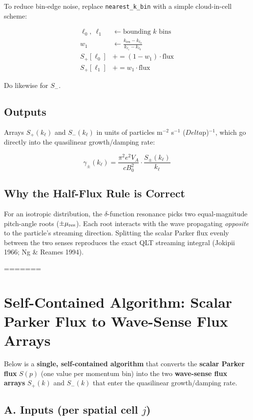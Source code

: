 To reduce bin-edge noise, replace \texttt{nearest\_k\_bin} with a simple cloud-in-cell scheme:

\[
\begin{aligned}
\ell_0,\ \ell_1 &\leftarrow \text{bounding $k$ bins} \\
w_1 &\leftarrow \frac{k_{\text{res}} - k_{\ell_0}}{k_{\ell_1} - k_{\ell_0}} \\
S_{+}[\ell_0] &\mathrel{+}= (1 - w_1) \cdot \text{flux} \\
S_{+}[\ell_1] &\mathrel{+}= w_1 \cdot \text{flux}
\end{aligned}
\]


Do likewise for $S_{-}$.

\subsection*{Outputs}

Arrays $S_{+}(k_\ell)$ and $S_{-}(k_\ell)$ in units of particles m$^{-2}$ s$^{-1}$ ($Delta$p)$^{-1}$, which go directly into the quasilinear growth/damping rate:

\[
\gamma_\pm(k_\ell) = \frac{\pi^{2} e^{2} V_A}{c B_0^{2}} \cdot \frac{S_\pm(k_\ell)}{k_\ell}
\]

\subsection*{Why the Half-Flux Rule is Correct}

For an isotropic distribution, the $\delta$-function resonance picks two equal-magnitude pitch-angle roots ($\pm \mu_{\rm res}$).  
Each root interacts with the wave propagating \textit{opposite} to the particle’s streaming direction.  
Splitting the scalar Parker flux evenly between the two senses reproduces the exact QLT streaming integral (Jokipii 1966; Ng \& Reames 1994).


=======


\section*{Self-Contained Algorithm: Scalar Parker Flux to Wave-Sense Flux Arrays}

Below is a \textbf{single, self-contained algorithm} that converts the \textbf{scalar Parker flux} $S(p)$ (one value per momentum bin) into the two \textbf{wave-sense flux arrays} $S_{+}(k)$ and $S_{-}(k)$ that enter the quasilinear growth/damping rate.

\subsection*{A. Inputs (per spatial cell $j$)}

